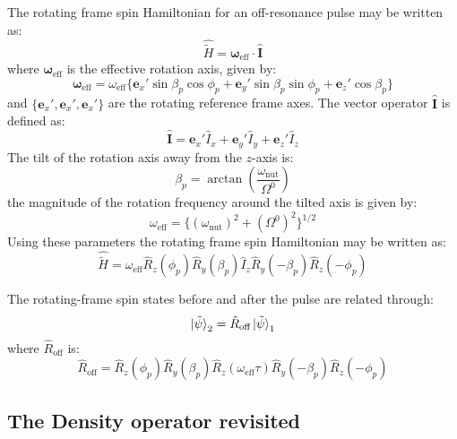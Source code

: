 The rotating frame spin Hamiltonian for an off-resonance pulse may be written as:
\begin{equation}
  \hat{\tilde{H}} = \boldsymbol{\omega}_{\text{eff}}\cdot\hat{\mathbf{I}}
\end{equation}
where $\boldsymbol{\omega}_{\text{eff}}$ is the effective rotation axis, given by:
\begin{equation}
  \boldsymbol{\omega}_{\text{eff}} = \omega_{\text{eff}}\{\mathbf{e}_x'\sin\beta_p\cos\phi_p + \mathbf{e}_y'\sin\beta_p\sin\phi_p + \mathbf{e}_z'\cos\beta_p\}
\end{equation}
and $\{\mathbf{e}_x',\mathbf{e}_x',\mathbf{e}_x'\}$ are the rotating reference frame axes. The vector operator
$\hat{\mathbf{I}}$ is defined as:
\begin{equation}
  \hat{\mathbf{I}} = \mathbf{e}_x'\hat{I}_x + \mathbf{e}_y'\hat{I}_y + \mathbf{e}_z'\hat{I}_z
\end{equation}
The tilt of the rotation axis away from the $z$-axis is:
\begin{equation}
  \beta_p = \arctan(\frac{\omega_{\text{nut}}}{\Omega^0})
\end{equation}
the magnitude of the rotation frequency around the tilted axis is given by:
\begin{equation}
  \omega_{\text{eff}} = \{(\omega_{\text{nut}})^2 + (\Omega^0)^2\}^{1/2}
\end{equation}
Using these parameters the rotating frame spin Hamiltonian may be written as:
\begin{equation}
  \hat{\tilde{H}} = \omega_{\text{eff}}\hat{R}_z(\phi_p)\hat{R}_y(\beta_p)\hat{I}_z\hat{R}_y(-\beta_p)\hat{R}_z(-\phi_p)
\end{equation}

The rotating-frame spin states before and after the pulse are related through:
\begin{equation}
  \ket{\tilde{\psi}}_2 = \hat{R}_{\text{off}}\ket{\tilde{\psi}}_1
\end{equation}
where $\hat{R}_{\text{off}}$ is:
\begin{equation}
  \hat{R}_{\text{off}} = \hat{R}_z(\phi_p)\hat{R}_y(\beta_p)\hat{R}_z(\omega_{\text{eff}}\tau)\hat{R}_y(-\beta_p)\hat{R}_z(-\phi_p)
\end{equation}

\subsection{The Density operator revisited}

